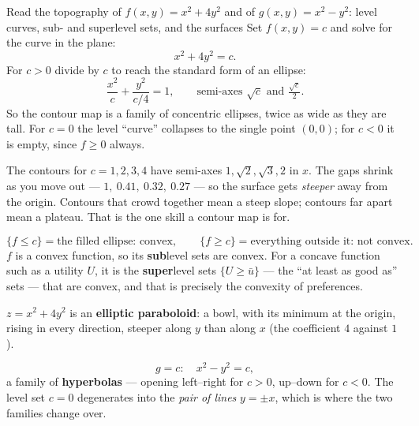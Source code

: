 \begin{worked}{Read the topography of $f(x,y)=x^{2}+4y^{2}$ and of $g(x,y)=x^{2}-y^{2}$: level curves, sub- and superlevel sets, and the surfaces}
Set $f(x,y)=c$ and solve for the curve in the plane:
\[
  x^{2}+4y^{2}=c .
\]
For $c>0$ divide by $c$ to reach the standard form of an ellipse:
\[
  \frac{x^{2}}{c}+\frac{y^{2}}{c/4}=1,
  \qquad\text{semi-axes } \sqrt c \text{ and } \tfrac{\sqrt c}{2} .
\]
So the contour map is a family of concentric ellipses, twice as wide as they
are tall. For $c=0$ the level ``curve'' collapses to the single point
$(0,0)$; for $c<0$ it is empty, since $f\ge0$ always.

The contours for $c=1,2,3,4$ have semi-axes $1,\sqrt2,\sqrt3,2$ in $x$. The
gaps shrink as you move out --- $1,\ 0.41,\ 0.32,\ 0.27$ --- so the surface
gets \emph{steeper} away from the origin. Contours that crowd together mean
a steep slope; contours far apart mean a plateau. That is the one skill a
contour map is for.

\[
  \{f\le c\}=\text{the filled ellipse: convex},
  \qquad
  \{f\ge c\}=\text{everything outside it: not convex.}
\]
$f$ is a convex function, so its \textbf{sub}level sets are convex. For a
concave function such as a utility $U$, it is the \textbf{super}level sets
$\{U\ge\bar u\}$ --- the ``at least as good as'' sets --- that are convex,
and that is precisely the convexity of preferences.

$z=x^{2}+4y^{2}$ is an \textbf{elliptic paraboloid}: a bowl, with its
minimum at the origin, rising in every direction, steeper along $y$ than
along $x$ (the coefficient $4$ against $1$).

\[
  g=c:\quad x^{2}-y^{2}=c ,
\]
a family of \textbf{hyperbolas} --- opening left--right for $c>0$, up--down
for $c<0$. The level set $c=0$ degenerates into the \emph{pair of lines}
$y=\pm x$, which is where the two families change over.


\end{worked}

